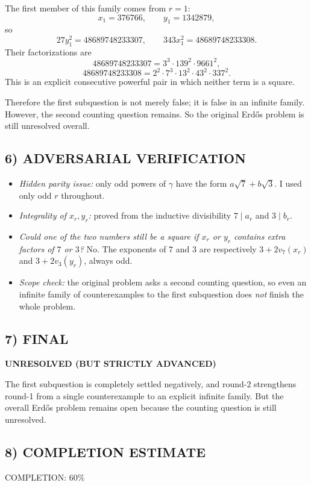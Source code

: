 The first member of this family comes from $r=1$:
\[
x_1=376766,\qquad y_1=1342879,
\]
so
\[
27y_1^2=48689748233307,
\qquad
343x_1^2=48689748233308.
\]
Their factorizations are
\[
48689748233307=3^3\cdot 139^2\cdot 9661^2,
\]
\[
48689748233308=2^2\cdot 7^3\cdot 13^2\cdot 43^2\cdot 337^2.
\]
This is an explicit consecutive powerful pair in which neither term is a square.

Therefore the first subquestion is not merely false; it is false in an infinite family.
However, the second counting question remains. So the original Erd\H{o}s problem is still unresolved overall.

\subsection*{6) ADVERSARIAL VERIFICATION}
\begin{itemize}
\item \emph{Hidden parity issue:} only odd powers of $\gamma$ have the form $a\sqrt7+b\sqrt3$. I used only odd $r$ throughout.
\item \emph{Integrality of $x_r,y_r$:} proved from the inductive divisibility $7\mid a_r$ and $3\mid b_r$.
\item \emph{Could one of the two numbers still be a square if $x_r$ or $y_r$ contains extra factors of $7$ or $3$?} No. The exponents of $7$ and $3$ are respectively $3+2v_7(x_r)$ and $3+2v_3(y_r)$, always odd.
\item \emph{Scope check:} the original problem asks a second counting question, so even an infinite family of counterexamples to the first subquestion does \emph{not} finish the whole problem.
\end{itemize}

\subsection*{7) FINAL}
\textbf{UNRESOLVED (BUT STRICTLY ADVANCED)}

The first subquestion is completely settled negatively, and round-2 strengthens round-1 from a single counterexample to an explicit infinite family. But the overall Erd\H{o}s problem remains open because the counting question is still unresolved.

\subsection*{8) COMPLETION ESTIMATE}
COMPLETION: 60\%

